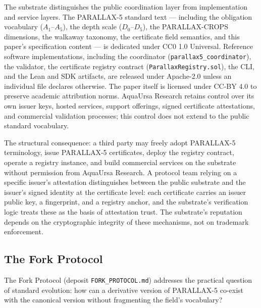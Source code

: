 \documentclass[11pt,a4paper]{article}
\begin{document}
The substrate distinguishes the public coordination layer from implementation and service layers. The PARALLAX-5 standard text --- including the obligation vocabulary ($A_1$--$A_5$), the depth scale ($D_0$--$D_5$), the PARALLAX-CROPS dimensions, the walkaway taxonomy, the certificate field semantics, and this paper's specification content --- is dedicated under CC0 1.0 Universal. Reference software implementations, including the coordinator (\texttt{parallax5\_coordinator}), the validator, the certificate registry contract (\texttt{ParallaxRegistry.sol}), the CLI, and the Lean and SDK artifacts, are released under Apache-2.0 unless an individual file declares otherwise. The paper itself is licensed under CC-BY 4.0 to preserve academic attribution norms. AquaUrsa Research retains control over its own issuer keys, hosted services, support offerings, signed certificate attestations, and commercial validation processes; this control does not extend to the public standard vocabulary.

The structural consequence: a third party may freely adopt PARALLAX-5 terminology, issue PARALLAX-5 certificates, deploy the registry contract, operate a registry instance, and build commercial services on the substrate without permission from AquaUrsa Research. A protocol team relying on a specific issuer's attestation distinguishes between the public substrate and the issuer's signed identity at the certificate level: each certificate carries an issuer public key, a fingerprint, and a registry anchor, and the substrate's verification logic treats these as the basis of attestation trust. The substrate's reputation depends on the cryptographic integrity of these mechanisms, not on trademark enforcement.

\subsection{The Fork Protocol}

The Fork Protocol (deposit \texttt{FORK\_PROTOCOL.md}) addresses the practical question of standard evolution: how can a derivative version of PARALLAX-5 co-exist with the canonical version without fragmenting the field's vocabulary?
\end{document}
